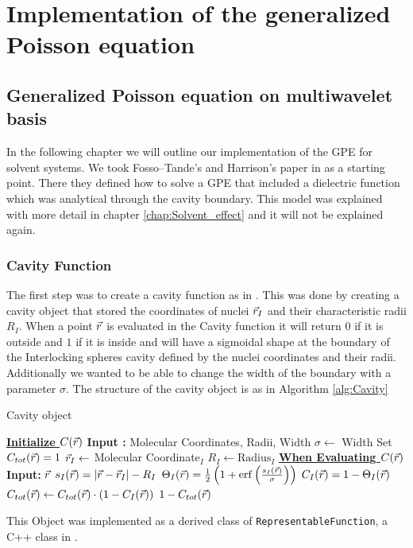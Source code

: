 \documentclass[..Thesis.tex]{subfiles}
\begin{document}
\chapter{Implementation of the generalized Poisson equation}\label{chap:implementation}
\section{Generalized Poisson equation on multiwavelet basis}
In the following chapter we will outline our implementation of the \ac{GPE}
for solvent systems. We took Fosso--Tande's and Harrison's
paper in \cite{FossoTande:2013ka} as a starting point. There they defined
how to solve a \ac{GPE} that included a dielectric function which was analytical
through the cavity boundary. This model was explained with more detail in chapter \ref{chap:Solvent_effect} and
it will not be explained again.

\subsection{Cavity Function}
The first step was to create a cavity function as in \cite{FossoTande:2013ka}.
This was done by creating a cavity object that stored the coordinates of nuclei
$\vec{r}_I$ and their characteristic radii $R_I$. When a point $\vec{r}$ is evaluated
in the Cavity function it will return $0$ if it is outside and $1$ if
it is inside  and will have a sigmoidal shape at the boundary  of the
Interlocking spheres cavity defined by the nuclei coordinates and their radii.
Additionally we wanted to be able to change the width of the
boundary with a parameter $\sigma$. The structure of the cavity object is as
in Algorithm \ref{alg:Cavity}

\begin{algorithm}
  \caption{Cavity object}\label{alg:Cavity}
  \begin{algorithmic}
    \STATE \underline{\textbf{Initialize $C(\vec{r})$}}
    \STATE \textbf{Input :} Molecular Coordinates, Radii, Width
    \STATE $\sigma \leftarrow $ Width
    \STATE Set $C_{tot}(\vec{r}) = 1$
     \STATE $\vec{r}_I \leftarrow $ Molecular Coordinate$_I$
     \STATE $R_I \leftarrow \text{Radius}_I$
    \ENDFOR
    \STATE
    \STATE \underline{\textbf{When Evaluating $C(\vec{r})$}}
    \STATE \textbf{Input: } $\vec{r}$
      \STATE $s_I(\vec{r}) = \abs{\vec{r} - \vec{r}_I} - R_I$
      \STATE $\Theta_I(\rvec) = \frac{1}{2}\left(1 + \erf\left(\frac{s_I(\rvec)}{\sigma}\right)\right)$
      \STATE $ C_I(\vec{r}) = 1 -\Theta_I(\vec{r}) $
      \STATE $ C_{tot}(\vec{r}) \leftarrow C_{tot}(\vec{r}) \cdot (1 - C_{I}(\vec{r}))$
    \ENDFOR
    \RETURN $ 1 - C_{tot}(\vec{r})$
  \end{algorithmic}
\end{algorithm}
This Object was implemented as a derived class of \verb!RepresentableFunction!,
a C++ class in \mrchem.
\end{document}
